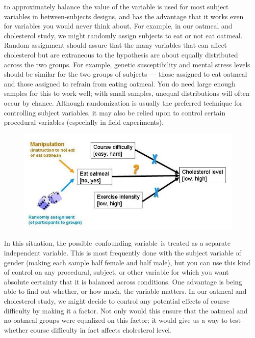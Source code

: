\begin{refsection}
 to approximately balance the value of the variable is used for most subject variables in between-subjects designs, and has the advantage that it works even for variables you would never think about. For example, in our oatmeal and cholesterol study, we might randomly assign subjects to eat or not eat oatmeal. Random assignment should assure that the many variables that can affect cholesterol but are extraneous to the hypothesis are about equally distributed across the two groups. For example, genetic susceptibility and mental stress levels should be similar for the two groups of subjects --- those assigned to eat oatmeal and those assigned to refrain from eating oatmeal. You do need large enough samples for this to work well; with small samples, unequal distributions will often occur by chance. Although randomization is usually the preferred technique for controlling subject variables, it may also be relied upon to control certain procedural variables (especially in field experiments).

\begin{figure}[htbp]
\centering
\includegraphics[keepaspectratio,width=\textwidth,height=0.75\textheight]{causaldiagramsexperimentrandomized.jpg}
\label{causaldiagramsexperimentrandomized.jpg}
\end{figure}

 In this situation, the possible confounding variable is treated as a separate independent variable. This is most frequently done with the subject variable of gender (making each sample half female and half male), but you can use this kind of control on any procedural, subject, or other variable for which you want absolute certainty that it is balanced across conditions. One advantage is being able to find out whether, or how much, the variable matters. In our oatmeal and cholesterol study, we might decide to control any potential effects of course difficulty by making it a factor. Not only would this ensure that the oatmeal and no-oatmeal groups were equalized on this factor; it would give us a way to test whether course difficulty in fact affects cholesterol level.


\end{refsection}
